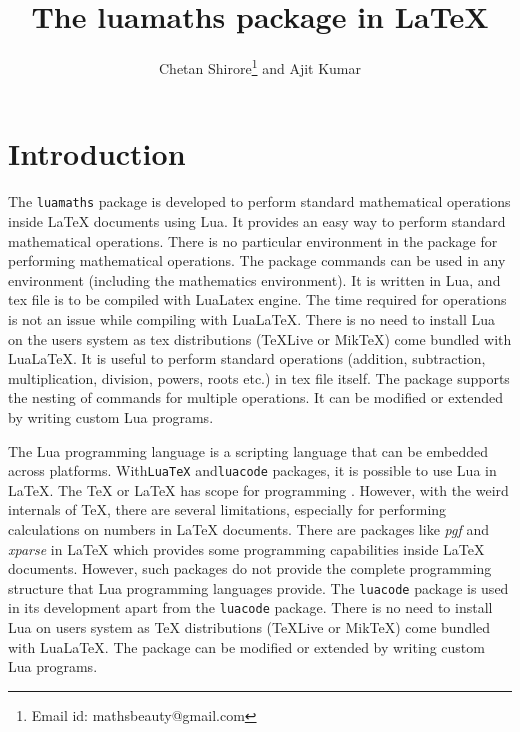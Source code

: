 \documentclass{article}
\begin{document}
\title{The luamaths package in LaTeX}
\author{Chetan Shirore\thanks{Email id: mathsbeauty@gmail.com} \space and  Ajit Kumar}
\maketitle
\section{Introduction}\label{section:introduction}
The \verb|luamaths| package is developed to perform standard mathematical operations inside LaTeX documents using Lua. It provides an easy way to perform standard mathematical operations. There is no particular environment in the package for performing mathematical operations. The package commands can be used in any environment (including the mathematics environment). It is written in Lua, and tex file is to be compiled with LuaLatex engine. The time required for operations is not an issue while compiling with LuaLaTeX. There is no need to install Lua on the users system as tex distributions (TeXLive or MikTeX) come bundled with LuaLaTeX. It is useful to perform standard operations (addition, subtraction, multiplication, division, powers, roots etc.) in tex file itself. The package supports the nesting of commands for multiple operations. It can be modified or extended by writing custom Lua programs.

The Lua \cite{online.luaorg} programming language is a scripting language that can be embedded across platforms. With\verb|LuaTeX| \cite{online.luatex}  and\verb|luacode| \cite{online.luacode} packages, it is possible to use Lua in LaTeX. The TeX  \cite{online.tex} or LaTeX has scope for programming \cite{online.texscript}. However, with the weird internals of TeX, there are several limitations, especially for performing calculations on numbers in LaTeX documents. There are packages like \emph{pgf} \cite{online.pgf} and  \emph{xparse}  \cite{online.xparse} in LaTeX which provides some programming capabilities inside LaTeX documents. However, such packages do not provide the complete programming structure that Lua programming languages provide. The \verb|luacode| \cite{online.luacode}  package is used in its development apart from the \verb|luacode| package. There is no need to install Lua on users system as TeX distributions (TeXLive or MikTeX) come bundled with LuaLaTeX. The package can be modified or extended by writing custom Lua programs.
\end{document}
